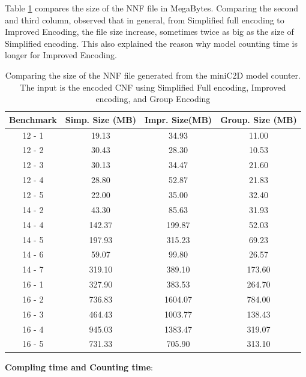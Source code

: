 Table \ref{tab:size compare} compares the size of the NNF file in MegaBytes. Comparing the second and third column, observed that in general, from Simplified full encoding to Improved Encoding, the file size increase, sometimes twice as big as the size of Simplified encoding.
This also explained the reason why model counting time is longer for Improved Encoding.
\begin{table}[]
    \centering
    \begin{tabular}{c|c c c}
    \hline
    \hline
Benchmark	&	Simp. Size (MB)	&	Impr. Size(MB)	&	Group. Size (MB)	\\
\hline
12	-	1	&	19.13	&	34.93	&	11.00	\\
12	-	2	&	30.43	&	28.30	&	10.53	\\
12	-	3	&	30.13	&	34.47	&	21.60	\\
12	-	4	&	28.80	&	52.87	&	21.83	\\
12	-	5	&	22.00	&	35.00	&	32.40	\\
14	-	2	&	43.30	&	85.63	&	31.93	\\
14	-	4	&	142.37	&	199.87	&	52.03	\\
14	-	5	&	197.93	&	315.23	&	69.23	\\
14	-	6	&	59.07	&	99.80	&	26.57	\\
14	-	7	&	319.10	&	389.10	&	173.60	\\
16	-	1	&	327.90	&	383.53	&	264.70	\\
16	-	2	&	736.83	&	1604.07	&	784.00	\\
16	-	3	&	464.43	&	1003.77	&	138.43	\\
16	-	4	&	945.03	&	1383.47	&	319.07	\\
16	-	5	&	731.33	&	705.90	&	313.10	\\
\hline
\hline
    \end{tabular}
    \caption{Comparing the size of the NNF file generated from the miniC2D model counter. The input is the encoded CNF using Simplified Full encoding, Improved encoding, and Group Encoding}
    \label{tab:size compare}
\end{table}
\textbf{Compling time and Counting time}:\\
